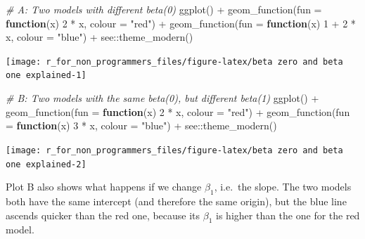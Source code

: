 \documentclass[
]{book}
\newenvironment{Shaded}{\begin{snugshade}}{\end{snugshade}}
\newcommand{\AttributeTok}[1]{\textcolor[rgb]{0.77,0.63,0.00}{#1}}
\newcommand{\CommentTok}[1]{\textcolor[rgb]{0.56,0.35,0.01}{\textit{#1}}}
\newcommand{\ControlFlowTok}[1]{\textcolor[rgb]{0.13,0.29,0.53}{\textbf{#1}}}
\newcommand{\DecValTok}[1]{\textcolor[rgb]{0.00,0.00,0.81}{#1}}
\newcommand{\FunctionTok}[1]{\textcolor[rgb]{0.00,0.00,0.00}{#1}}
\newcommand{\NormalTok}[1]{#1}
\newcommand{\SpecialCharTok}[1]{\textcolor[rgb]{0.00,0.00,0.00}{#1}}
\newcommand{\StringTok}[1]{\textcolor[rgb]{0.31,0.60,0.02}{#1}}
\begin{document}
\begin{Shaded}
\begin{Highlighting}[]
\CommentTok{\# A: Two models with different beta(0)}
\FunctionTok{ggplot}\NormalTok{() }\SpecialCharTok{+}
  \FunctionTok{geom\_function}\NormalTok{(}\AttributeTok{fun =} \ControlFlowTok{function}\NormalTok{(x) }\DecValTok{2} \SpecialCharTok{*}\NormalTok{ x, }\AttributeTok{colour =} \StringTok{"red"}\NormalTok{) }\SpecialCharTok{+}
  \FunctionTok{geom\_function}\NormalTok{(}\AttributeTok{fun =} \ControlFlowTok{function}\NormalTok{(x) }\DecValTok{1} \SpecialCharTok{+} \DecValTok{2} \SpecialCharTok{*}\NormalTok{ x, }\AttributeTok{colour =} \StringTok{"blue"}\NormalTok{) }\SpecialCharTok{+}
\NormalTok{  see}\SpecialCharTok{::}\FunctionTok{theme\_modern}\NormalTok{()}
\end{Highlighting}
\end{Shaded}

\begin{center}\texttt{[image: r\_for\_non\_programmers\_files/figure-latex/beta zero and beta one explained-1]} \end{center}

\begin{Shaded}
\begin{Highlighting}[]

\CommentTok{\# B: Two models with the same beta(0), but different beta(1)}
\FunctionTok{ggplot}\NormalTok{() }\SpecialCharTok{+}
  \FunctionTok{geom\_function}\NormalTok{(}\AttributeTok{fun =} \ControlFlowTok{function}\NormalTok{(x) }\DecValTok{2} \SpecialCharTok{*}\NormalTok{ x, }\AttributeTok{colour =} \StringTok{"red"}\NormalTok{) }\SpecialCharTok{+}
  \FunctionTok{geom\_function}\NormalTok{(}\AttributeTok{fun =} \ControlFlowTok{function}\NormalTok{(x) }\DecValTok{3} \SpecialCharTok{*}\NormalTok{ x, }\AttributeTok{colour =} \StringTok{"blue"}\NormalTok{) }\SpecialCharTok{+}
\NormalTok{  see}\SpecialCharTok{::}\FunctionTok{theme\_modern}\NormalTok{()}
\end{Highlighting}
\end{Shaded}

\begin{center}\texttt{[image: r\_for\_non\_programmers\_files/figure-latex/beta zero and beta one explained-2]} \end{center}

Plot B also shows what happens if we change \(\beta_1\), i.e.~the slope. The two models both have the same intercept (and therefore the same origin), but the blue line ascends quicker than the red one, because its \(\beta_1\) is higher than the one for the red model.
\end{document}

